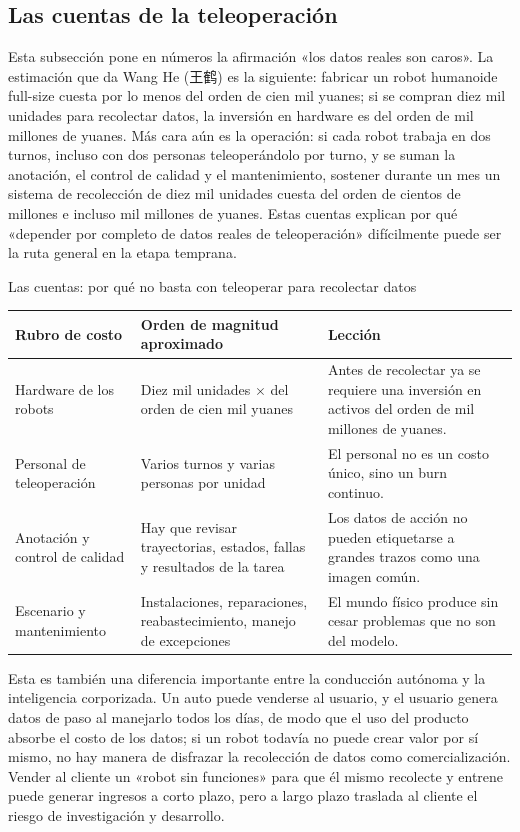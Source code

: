 \subsection{Las cuentas de la teleoperación}

Esta subsección pone en números la afirmación «los datos reales son caros». La estimación que da Wang He (王鹤) es la siguiente: fabricar un robot humanoide full-size cuesta por lo menos del orden de cien mil yuanes; si se compran diez mil unidades para recolectar datos, la inversión en hardware es del orden de mil millones de yuanes. Más cara aún es la operación: si cada robot trabaja en dos turnos, incluso con dos personas teleoperándolo por turno, y se suman la anotación, el control de calidad y el mantenimiento, sostener durante un mes un sistema de recolección de diez mil unidades cuesta del orden de cientos de millones e incluso mil millones de yuanes. Estas cuentas explican por qué «depender por completo de datos reales de teleoperación» difícilmente puede ser la ruta general en la etapa temprana.

\begin{knowledgebox}{Las cuentas: por qué no basta con teleoperar para recolectar datos}
\begin{tabularx}{\textwidth}{p{}p{}X}
\toprule
Rubro de costo & Orden de magnitud aproximado & Lección \\
\midrule
Hardware de los robots & Diez mil unidades $\times$ del orden de cien mil yuanes & Antes de recolectar ya se requiere una inversión en activos del orden de mil millones de yuanes. \\
Personal de teleoperación & Varios turnos y varias personas por unidad & El personal no es un costo único, sino un burn continuo. \\
Anotación y control de calidad & Hay que revisar trayectorias, estados, fallas y resultados de la tarea & Los datos de acción no pueden etiquetarse a grandes trazos como una imagen común. \\
Escenario y mantenimiento & Instalaciones, reparaciones, reabastecimiento, manejo de excepciones & El mundo físico produce sin cesar problemas que no son del modelo. \\
\bottomrule
\end{tabularx}
\end{knowledgebox}

Esta es también una diferencia importante entre la conducción autónoma y la inteligencia corporizada. Un auto puede venderse al usuario, y el usuario genera datos de paso al manejarlo todos los días, de modo que el uso del producto absorbe el costo de los datos; si un robot todavía no puede crear valor por sí mismo, no hay manera de disfrazar la recolección de datos como comercialización. Vender al cliente un «robot sin funciones» para que él mismo recolecte y entrene puede generar ingresos a corto plazo, pero a largo plazo traslada al cliente el riesgo de investigación y desarrollo.

